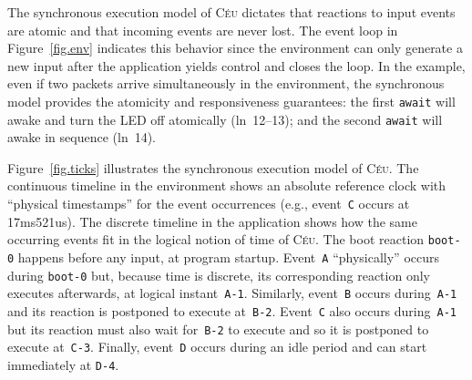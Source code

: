 \documentclass[sigplan,10pt,review,anonymous]{acmart}\settopmatter{printfolios=true,printccs=false,printacmref=false}
\newcommand{\CEU}{\textsc{C\'{e}u}\xspace}
\newcommand{\code}[1] {{\small{\texttt{#1}}}}
\begin{document}
The synchronous execution model of \CEU dictates that reactions to input events
are atomic and that incoming events are never lost.
%
The event loop in Figure~\ref{fig.env} indicates this behavior since the
environment can only generate a new input after the application yields control
and closes the loop.
%
In the example, even if two packets arrive simultaneously in the environment,
the synchronous model provides the atomicity and responsiveness guarantees:
    the first \code{await} will awake and turn the LED off atomically
    (ln~12--13);
    and the second \code{await} will awake in sequence (ln~14).
%

Figure~\ref{fig.ticks} illustrates the synchronous execution model of \CEU.
%
The continuous timeline in the environment shows an absolute reference clock
with ``physical timestamps'' for the event occurrences (e.g., event~\code{C}
occurs at 17ms521us).
%
The discrete timeline in the application shows how the same occurring events
fit in the logical notion of time of \CEU.
%
The boot reaction \code{boot-0} happens before any input, at program startup.
%
Event~\code{A} ``physically'' occurs during \code{boot-0} but, because time
is discrete, its corresponding reaction only executes afterwards, at logical
instant~\code{A-1}.
%
Similarly, event~\code{B} occurs during~\code{A-1} and its reaction is
postponed to execute at~\code{B-2}.
%
Event~\code{C} also occurs during~\code{A-1} but its reaction must also wait
for~\code{B-2} to execute and so it is postponed to execute at~\code{C-3}.
%
Finally, event~\code{D} occurs during an idle period and can start immediately
at \code{D-4}.
%
\end{document}
